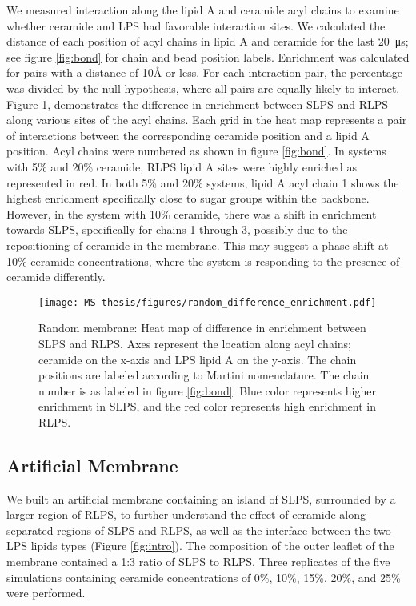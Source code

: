\documentclass[10pt, letterpaper]{article}
\begin{document}
\newpage
We measured interaction along the lipid A and ceramide acyl chains to examine whether ceramide and LPS had favorable interaction sites. We calculated the distance of each position of acyl chains in lipid A and ceramide for the last \SI{20}{\micro\second}; see figure \ref{fig:bond} for chain and bead position labels. Enrichment was calculated for pairs with a distance of 10\si{\angstrom} or less. For each interaction pair, the percentage was divided by the null hypothesis, where all pairs are equally likely to interact.  
Figure \ref{fig:rand_enrichment}, demonstrates the difference in enrichment between SLPS and RLPS along various sites of the acyl chains. Each grid in the heat map represents a pair of interactions between the corresponding ceramide position and a lipid A position. Acyl chains were numbered as shown in figure \ref{fig:bond}. 
In systems with 5\% and 20\% ceramide, RLPS lipid A sites were highly enriched as represented in red. In both 5\% and 20\% systems, lipid A acyl chain 1 shows the highest enrichment specifically close to sugar groups within the backbone. However, in the system with 10\% ceramide, there was a shift in enrichment towards SLPS, specifically for chains 1 through 3, possibly due to the repositioning of ceramide in the membrane. This may suggest a phase shift at 10\% ceramide concentrations, where the system is responding to the presence of ceramide differently. 



\begin{figure}[H]
   \centerline{\texttt{[image: MS thesis/figures/random\_difference\_enrichment.pdf]}}
  \caption[Random Membrane: Ceramide Enrichment]{Random membrane: Heat map of difference in enrichment between SLPS and RLPS. Axes represent the location along acyl chains; ceramide on the x-axis and LPS lipid A on the y-axis. The chain positions are labeled according to Martini nomenclature. The chain number is as labeled in figure \ref{fig:bond}. Blue color represents higher enrichment in SLPS, and the red color represents high enrichment in RLPS.}
  \label{fig:rand_enrichment}
\end{figure}

\newpage
 
\subsection{Artificial Membrane}
\par We built an artificial membrane containing an island of SLPS, surrounded by a larger region of RLPS, to further understand the effect of ceramide along separated regions of SLPS and RLPS, as well as the interface between the two LPS lipids types (Figure \ref{fig:intro}).
The composition of the outer leaflet of the membrane contained a 1:3 ratio of SLPS to RLPS. Three replicates of the five simulations containing ceramide concentrations of  0\%, 10\%, 15\%, 20\%, and 25\% were performed. 
\end{document}
